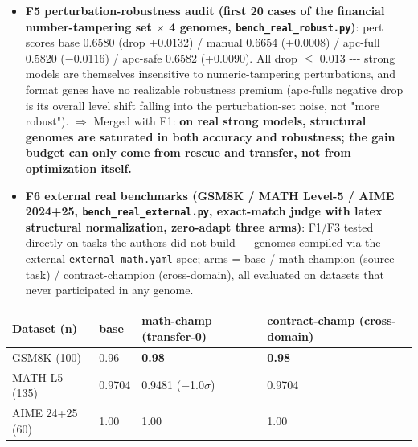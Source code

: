 \begin{itemize}
\tightlist
\item
  \textbf{F5 perturbation-robustness audit (first 20 cases of the financial number-tampering set \(\times\) 4 genomes, \texttt{bench\_real\_robust.py})}: pert scores base 0.6580 (drop +0.0132) / manual 0.6654 (+0.0008) / apc-full 0.5820 (\(-\)0.0116) / apc-safe 0.6582 (+0.0090). All \textbar drop\textbar{} \(\leq\) 0.013 -\/-\/- strong models are themselves insensitive to numeric-tampering perturbations, and format genes have no realizable robustness premium (apc-full\textquotesingle s negative drop is its overall level shift falling into the perturbation-set noise, not "more robust"). \(\Rightarrow\) Merged with F1: \textbf{on real strong models, structural genomes are saturated in both accuracy and robustness; the gain budget can only come from rescue and transfer, not from optimization itself.}
\item
  \textbf{F6 external real benchmarks (GSM8K / MATH Level-5 / AIME 2024+25, \texttt{bench\_real\_external.py}, exact-match judge with latex structural normalization, zero-adapt three arms)}: F1/F3 tested directly on tasks the authors did not build -\/-\/- genomes compiled via the external \texttt{external\_math.yaml} spec; arms = base / math-champion (source task) / contract-champion (cross-domain), all evaluated on datasets that never participated in any genome.
\end{itemize}

\begin{longtable}[]{@{}llll@{}}
\toprule\noalign{}
Dataset (n) & base & math-champ (transfer-0) & contract-champ (cross-domain) \\
\midrule\noalign{}
\endhead
\bottomrule\noalign{}
\endlastfoot
GSM8K (100) & 0.96 & \textbf{0.98} & \textbf{0.98} \\
MATH-L5 (135) & 0.9704 & 0.9481 (\(-\)1.0\(\sigma\)) & 0.9704 \\
AIME 24+25 (60) & 1.00 & 1.00 & 1.00 \\
\end{longtable}


